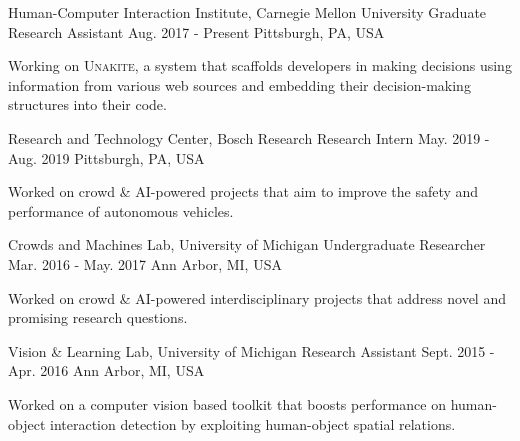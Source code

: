 
\begin{cventries}
\cventry
  {Human-Computer Interaction Institute, Carnegie Mellon University} %
  {Graduate Research Assistant } %
  {Aug. 2017 - Present} %
  {Pittsburgh, PA, USA} %
  {
    \begin{cvitems} %
      \item {Working on \textsc{Unakite}, a system that scaffolds developers in making decisions using information from various web sources and embedding their decision-making structures into their code.}
    \end{cvitems}
  }


\cventry
  {Research and Technology Center, Bosch Research} %
  {Research Intern } %
  {May. 2019 - Aug. 2019} %
  {Pittsburgh, PA, USA} %
  {
    \begin{cvitems} %
      \item {Worked on crowd \& AI-powered  projects that aim to improve the safety and performance of autonomous vehicles.}
    \end{cvitems}
  }

\cventry
  {Crowds and Machines Lab, University of Michigan} %
  {Undergraduate Researcher } %
  {Mar. 2016 - May. 2017} %
  {Ann Arbor, MI, USA} %
  {
    \begin{cvitems} %
      \item {Worked on crowd \& AI-powered interdisciplinary projects that address novel and promising research questions.}
    \end{cvitems}
  }

\cventry
  {Vision \& Learning Lab, University of Michigan} %
  {Research Assistant } %
  {Sept. 2015 - Apr. 2016} %
  {Ann Arbor, MI, USA} %
  {
    \begin{cvitems} %
      \item {Worked on a computer vision based toolkit that boosts performance on human-object interaction detection by exploiting human-object spatial relations.}
    \end{cvitems}
  }
\end{cventries}






